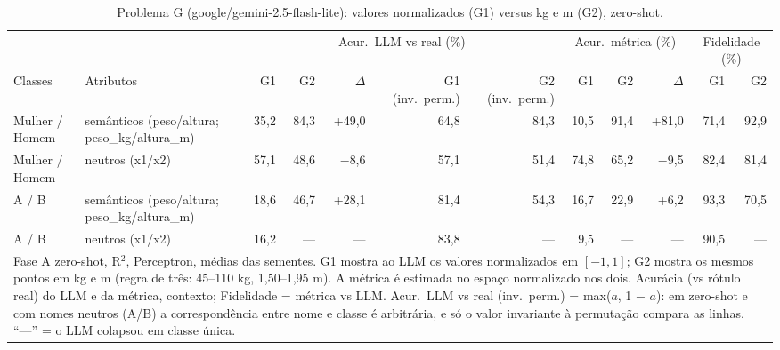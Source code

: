 \begin{table}[htbp]
\centering
\footnotesize
\caption{Problema G (google/gemini-2.5-flash-lite): valores normalizados (G1) versus kg e m (G2), zero-shot.}
\label{tab:bloco3_G1_vs_G2_zero_shot_flashlite}
\begin{tabular}{llrrrrrrrrrr}
\toprule
 &  & \multicolumn{5}{c}{Acur.\ LLM vs real (\%)} & \multicolumn{3}{c}{Acur.\ métrica (\%)} & \multicolumn{2}{c}{Fidelidade (\%)} \\ \cmidrule(lr){3-7} \cmidrule(lr){8-10} \cmidrule(lr){11-12}
Classes & Atributos & G1 & G2 & $\Delta$ & G1 (inv.\ perm.) & G2 (inv.\ perm.) & G1 & G2 & $\Delta$ & G1 & G2 \\
\midrule
Mulher / Homem & semânticos (peso/altura; peso\_kg/altura\_m) & 35,2 & 84,3 & +49,0 & 64,8 & 84,3 & 10,5 & 91,4 & +81,0 & 71,4 & 92,9 \\
Mulher / Homem & neutros (x1/x2) & 57,1 & 48,6 & $-$8,6 & 57,1 & 51,4 & 74,8 & 65,2 & $-$9,5 & 82,4 & 81,4 \\
A / B & semânticos (peso/altura; peso\_kg/altura\_m) & 18,6 & 46,7 & +28,1 & 81,4 & 54,3 & 16,7 & 22,9 & +6,2 & 93,3 & 70,5 \\
A / B & neutros (x1/x2) & 16,2 & — & — & 83,8 & — & 9,5 & — & — & 90,5 & — \\
\bottomrule
\multicolumn{12}{p{0.95\linewidth}}{\footnotesize Fase A zero-shot, R$^2$, Perceptron, médias das sementes. G1 mostra ao LLM os valores normalizados em $[-1, 1]$; G2 mostra os mesmos pontos em kg e m (regra de três: 45–110 kg, 1,50–1,95 m). A métrica é estimada no espaço normalizado nos dois. Acurácia (vs rótulo real) do LLM e da métrica, contexto; Fidelidade = métrica vs LLM. Acur.\ LLM vs real (inv.\ perm.) = max($a$, 1 $-$ $a$): em zero-shot e com nomes neutros (A/B) a correspondência entre nome e classe é arbitrária, e só o valor invariante à permutação compara as linhas. ``—'' = o LLM colapsou em classe única.} \\
\end{tabular}
\end{table}
